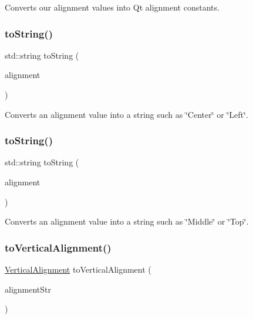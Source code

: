 Converts our alignment values into Qt alignment constants. 

\mbox{\label{namespacesgl_aef9c5af6ac36ff81fed4a454281a51cc}} 
\subsubsection{\texorpdfstring{to\+String()}{toString()}\hspace{0.1cm}{\footnotesize\ttfamily [1/2]}}
{\footnotesize\ttfamily std\+::string to\+String (\begin{DoxyParamCaption}\item[{\mbox{\hyperlink{namespacesgl_aa00e70829e72ff16addc4d9f06fe3bc5}{Horizontal\+Alignment}}}]{alignment }\end{DoxyParamCaption})}



Converts an alignment value into a string such as \char`\"{}\+Center\char`\"{} or \char`\"{}\+Left\char`\"{}. 

\mbox{\label{namespacesgl_a41622e629cac909b592ac6a63ee7ba4a}} 
\subsubsection{\texorpdfstring{to\+String()}{toString()}\hspace{0.1cm}{\footnotesize\ttfamily [2/2]}}
{\footnotesize\ttfamily std\+::string to\+String (\begin{DoxyParamCaption}\item[{\mbox{\hyperlink{namespacesgl_a9c2ed22cfbd21f13df24ea193b310aee}{Vertical\+Alignment}}}]{alignment }\end{DoxyParamCaption})}



Converts an alignment value into a string such as \char`\"{}\+Middle\char`\"{} or \char`\"{}\+Top\char`\"{}. 

\mbox{\label{namespacesgl_af174d302920e35357e808748a2dff8bf}} 
\subsubsection{\texorpdfstring{to\+Vertical\+Alignment()}{toVerticalAlignment()}}
{\footnotesize\ttfamily \mbox{\hyperlink{namespacesgl_a9c2ed22cfbd21f13df24ea193b310aee}{Vertical\+Alignment}} to\+Vertical\+Alignment (\begin{DoxyParamCaption}\item[{const std\+::string \&}]{alignment\+Str }\end{DoxyParamCaption})}



